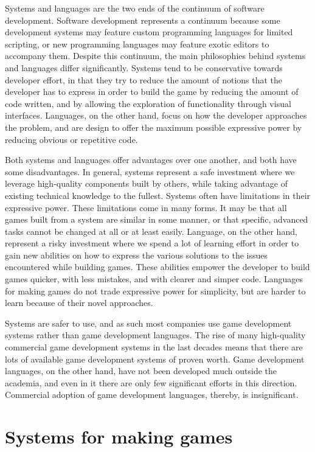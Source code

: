 Systems and languages are the two ends of the continuum of software development. Software development represents a continuum because some development systems may feature custom programming languages for limited scripting, or new programming languages may feature exotic editors to accompany them. Despite this continuum, the main philosophies behind systems and languages differ significantly. Systems tend to be conservative towards developer effort, in that they try to reduce the amount of notions that the developer has to express in order to build the game by reducing the amount of code written, and by allowing the exploration of functionality through visual interfaces. Languages, on the other hand, focus on how the developer approaches the problem, and are design to offer the maximum possible expressive power by reducing obvious or repetitive code.

Both systems and languages offer advantages over one another, and both have some disadvantages. In general, systems represent a safe investment where we leverage high-quality components built by others, while taking advantage of existing technical knowledge to the fullest. Systems often have limitations in their expressive power. These limitations come in many forms. It may be that all games built from a system are similar in some manner, or that specific, advanced tasks cannot be changed at all or at least easily. Language, on the other hand, represent a risky investment where we spend a lot of learning effort in order to gain new abilities on how to express the various solutions to the issues encountered while building games. These abilities empower the developer to build games quicker, with less mistakes, and with clearer and simper code. Languages for making games do not trade expressive power for simplicity, but are harder to learn because of their novel approaches.

Systems are safer to use, and as such most companies use game development systems rather than game development languages. The rise of many high-quality commercial game development systems in the last decades means that there are lots of available game development systems of proven worth. Game development languages, on the other hand, have not been developed much outside the academia, and even in it there are only few significant efforts in this direction. Commercial adoption of game development languages, thereby, is insignificant.


\section{Systems for making games}

